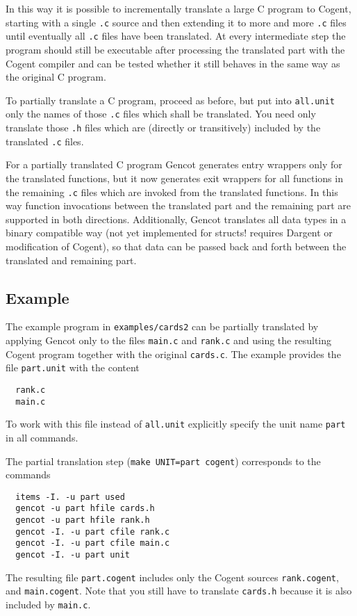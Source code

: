 \documentclass[a4paper]{report}
\newcommand{\code}[1]{\textnormal{\texttt{#1}}}
\begin{document}
In this way it is possible to incrementally translate a large C program to Cogent, starting with a single \code{.c} 
source and then extending it to more and more \code{.c} files until eventually all \code{.c} files have been translated.
At every intermediate step the program should still be executable after processing the translated part with the Cogent
compiler and can be tested whether it still behaves in the same way as the original C program.

To partially translate a C program, proceed as before, but put into \code{all.unit} only the names of those \code{.c}
files which shall be translated. You need only translate those \code{.h} files which are (directly or transitively)
included by the translated \code{.c} files. 

For a partially translated C program Gencot generates entry wrappers only for the translated functions, but it now
generates exit wrappers for all functions in the remaining \code{.c} files which are invoked from the translated functions.
In this way function invocations between the translated part and the remaining part are supported in both directions.
Additionally, Gencot translates all data types in a binary compatible way (not yet implemented for structs! requires Dargent 
or modification of Cogent), so that data can be passed back and forth between the translated and remaining part.

\subsection{Example}

The example program in \code{examples/cards2} can be partially translated by applying Gencot only to the files \code{main.c}
and \code{rank.c} and using the resulting Cogent program together with the original \code{cards.c}. The example provides
the file \code{part.unit} with the content
\begin{verbatim}
  rank.c
  main.c
\end{verbatim}
To work with this file instead of \code{all.unit} explicitly specify the unit name \code{part} in all commands.

The partial translation step (\code{make UNIT=part cogent}) corresponds to the commands
\begin{verbatim}
  items -I. -u part used
  gencot -u part hfile cards.h
  gencot -u part hfile rank.h
  gencot -I. -u part cfile rank.c
  gencot -I. -u part cfile main.c
  gencot -I. -u part unit
\end{verbatim}
The resulting file \code{part.cogent} includes only the Cogent sources \code{rank.cogent}, and
\code{main.cogent}. Note that you still have to translate \code{cards.h} because it is also included by \code{main.c}.
\end{document}

